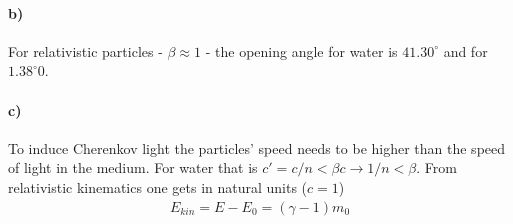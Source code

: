 \documentclass{article}
\begin{document}
\paragraph{b)}
For relativistic particles - $\beta \approx 1$ - the opening angle for water is $41.30^\circ$ and for $1.38^\circ0$.

\paragraph{c)}
To induce Cherenkov light the particles' speed needs to be higher than the speed of light in the medium. For water that is $c' = c/n < \beta c \rightarrow 1/n < \beta$.
From relativistic kinematics one gets in natural units ($c=1$)
\begin{align*}
E_{kin} = E - E_0 = (\gamma - 1) m_0
\end{align*}
\end{document}
